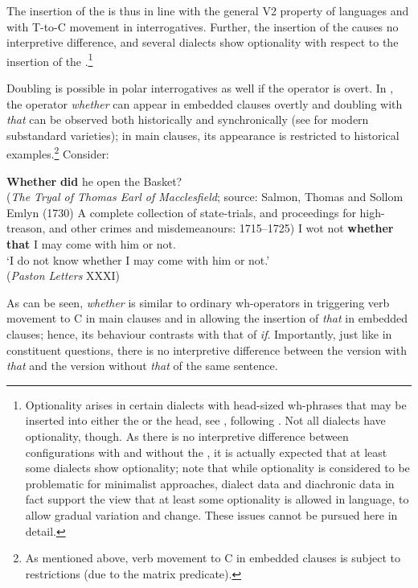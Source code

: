 \documentclass[output=paper,modfonts, hidelinks, newtxmath]{langscibook}
\begin{document}
The insertion of the  is thus in line with the general V2 property of  languages and with T-to-C movement in  interrogatives. Further, the insertion of the  causes no interpretive difference, and several dialects show optionality with respect to the insertion of the .\footnote{Optionality arises in certain dialects with head-sized wh-phrases that may be inserted into either the  or the head, see \citet{bacskaiatkari2018sardis}, following \citet{bayerbrandner2008}. Not all dialects have optionality, though. As there is no interpretive difference between configurations with and without the , it is actually expected that at least some dialects show optionality; note that while optionality is considered to be problematic for minimalist approaches, dialect data and diachronic data in fact support the view that at least some optionality is allowed in language, to allow gradual variation and change. These issues cannot be pursued here in detail.}

\newpage 
Doubling is possible in polar interrogatives as well if the operator is overt. In , the operator \textit{whether} can appear in embedded clauses overtly and doubling with \textit{that} can be observed both historically and synchronically (see  \citealt{vangelderen2009} for modern substandard varieties); in main clauses, its appearance is restricted to historical examples.\footnote{As mentioned above, verb movement to C in embedded clauses is subject to restrictions (due to the matrix predicate).} Consider:

\ea 
	\ea 
    	\textbf{Whether} \textbf{did} he open the Basket?\\
		(\textit{The Tryal of Thomas Earl of Macclesfield}; source: Salmon, Thomas and Sollom Emlyn (1730) A complete collection 	 of state-trials, and proceedings for high-treason, and other crimes and misdemeanours: 1715--1725)
	\ex 
    I wot not \textbf{whether} \textbf{that} I may come with him or not. 				\label{whetherthat}\\
	`I do not know whether I may come with him or not.'\\\hfill(\textit{Paston Letters} XXXI)
	\z
\z

\noindent As can be seen, \textit{whether} is similar to ordinary wh-operators in triggering verb movement to C in main clauses and in allowing the insertion of \textit{that} in embedded clauses; hence, its behaviour contrasts with that of \textit{if}. Importantly, just like in constituent questions, there is no interpretive difference between the version with \textit{that} and the version without \textit{that} of the same sentence.
\end{document}
